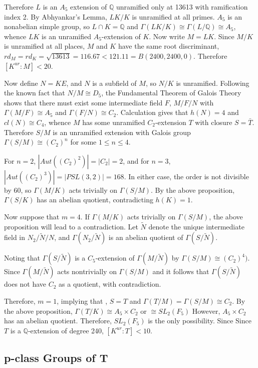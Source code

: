 \documentclass[12pt]{extarticle}
\newcommand{\Q}{\mathbb{Q}}
\newcommand{\<}{\langle}
\renewcommand{\>}{\rangle}
\theoremstyle{definition}
\begin{document}
Therefore $L$ is an $A_5$ extension of $\Q$ unramified only at 13613 with ramification index 2. By Abhyankar's Lemma, $LK/K$ is unramified at all primes. $A_5$ is an nonabelian simple group, so $L \cap K = \Q$ and $\Gamma(LK/K) \cong \Gamma(L/\Q) \cong A_5$, whence $LK$ is an unramified $A_5$-extension of $K$.
Now write $M=LK$. Since $M/K$ is unramified at all places, $M$ and $K$ have the same root discriminant, $rd_M = rd_K = \sqrt{13613} = 116.67 < 121.11 = B(2400,2400,0)$. Therefore $[K^{ur}:M]<20$. \par
Now define $N=KE$, and $N$ is a subfield of $M$, so $N/K$ is unramified. Following the known fact that $N/M \cong D_5$, the Fundamental Theorem of Galois Theory shows that there must exist some intermediate field $F$, $M/F/N$ with $\Gamma(M/F) \cong A_5$ and $\Gamma(F/N) \cong C_2$. Calculation gives that $h(N)=4$ and $cl(N) \cong C_4$, whence $M$ has some unramified $C_2$-extension $T$ with closure $S = \bar{T}$. Therefore $S/M$ is an unramified extension with Galois group $\Gamma(S/M) \cong \left(C_2 \right)^{n}$ for some $1 \leq n \leq 4$. \par
For $n=2$, $|Aut((C_2)^2)| = |C_2| = 2$, and for $n=3$, $|Aut((C_2)^3)| = |PSL(3,2)| = 168$. In either case, the order is not divisible by 60, so $\Gamma(M/K)$ acts trivially on $\Gamma(S/M)$. By the above proposition, $\Gamma(S/K)$ has an abelian quotient, contradicting $h(K)=1$. \par
Now suppose that $m=4$. 
If $\Gamma(M/K)$ acts trivially on $\Gamma(S/M)$, the above proposition will lead to a contradiction. Let $\tilde{N}$ denote the unique intermediate field in $N_2/\tilde{N}/N$, and $\Gamma(N_2/\tilde{N})$ is an abelian quotient of $\Gamma(S/\tilde{N})$. \par 
Noting that  $\Gamma(S/\tilde{N})$ is a $C_5$-extension of
$\Gamma(M/\tilde{N})$ by $\Gamma(S/M) \cong (C_2)^{4})$. Since 
$\Gamma(M/\tilde{N})$ acts nontrivially on $\Gamma(S/M)$
 and it follows that  $\Gamma(S/\tilde{N})$ does not have $C_2$ as a quotient, with contradiction. \par
Therefore, $m = 1$, implying that , $S=T$ and $\Gamma(T/M) = \Gamma(S/M) \cong C_2$. By the above proposition, $\Gamma(T/K) \cong A_5 \times C_2$  or $\cong SL_2(F_5)$ However, $A_5 \times C_2$ has an abelian quotient. Therefore,  $SL_2(F_5)$ is the only possibility. Since Since $T$ is a $\Q$-extension of degree 240, $[K^{ur}:T] < 10$. 

\subsection{p-class Groups of T}
\end{document}
